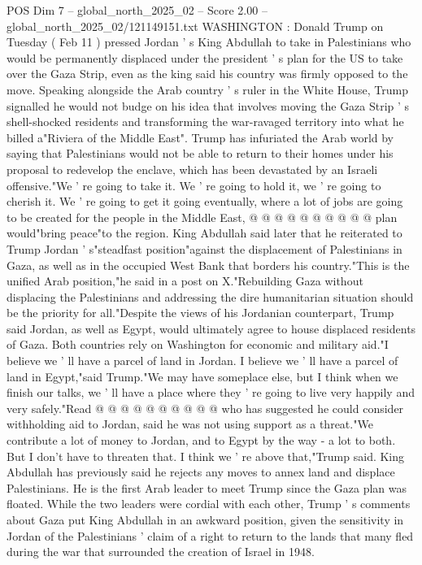 \begin{textsample}{POS Dim 7 – global\_north\_2025\_02 – Score 2.00 – global\_north\_2025\_02/121149151.txt}  \label{ex:f7_pos_383}
WASHINGTON : Donald Trump on Tuesday ( Feb 11 ) pressed Jordan ' s King Abdullah to take in Palestinians who would be permanently displaced under the president ' s plan for the US to take over the Gaza Strip, even as the king said his country was firmly opposed to the move.
Speaking alongside the Arab country ' s ruler in the White House, Trump signalled he would not budge on his idea that involves moving the Gaza Strip ' s shell-shocked residents and transforming the war-ravaged territory into what he billed a"Riviera of the Middle East".
Trump has infuriated the Arab world by saying that Palestinians would not be able to return to their homes under his proposal to redevelop the enclave, which has been devastated by an Israeli offensive."We ' re going to take it.
We ' re going to hold it, we ' re going to cherish it.
We ' re going to get it going eventually, where a lot of jobs are going to be created for the people in the Middle East, @ @ @ @ @ @ @ @ @ @ plan would"bring peace"to the region.
King Abdullah said later that he reiterated to Trump Jordan ' s"steadfast position"against the displacement of Palestinians in Gaza, as well as in the occupied West Bank that borders his country."This is the unified Arab position,"he said in a post on X."Rebuilding Gaza without displacing the Palestinians and addressing the dire humanitarian situation should be the priority for all."Despite the views of his Jordanian counterpart, Trump said Jordan, as well as Egypt, would ultimately agree to house displaced residents of Gaza.
Both countries rely on Washington for economic and military aid."I believe we ' ll have a parcel of land in Jordan.
I believe we ' ll have a parcel of land in Egypt,"said Trump."We may have someplace else, but I think when we finish our talks, we ' ll have a place where they ' re going to live very happily and very safely."Read @ @ @ @ @ @ @ @ @ @ who has suggested he could consider withholding aid to Jordan, said he was not using support as a threat."We contribute a lot of money to Jordan, and to Egypt by the way - a lot to both.
But I don't have to threaten that.
I think we ' re above that,"Trump said.
King Abdullah has previously said he rejects any moves to annex land and displace Palestinians.
He is the first Arab leader to meet Trump since the Gaza plan was floated.
While the two leaders were cordial with each other, Trump ' s comments about Gaza put King Abdullah in an awkward position, given the sensitivity in Jordan of the Palestinians ' claim of a right to return to the lands that many fled during the war that surrounded the creation of Israel in 1948.

\end{textsample}
